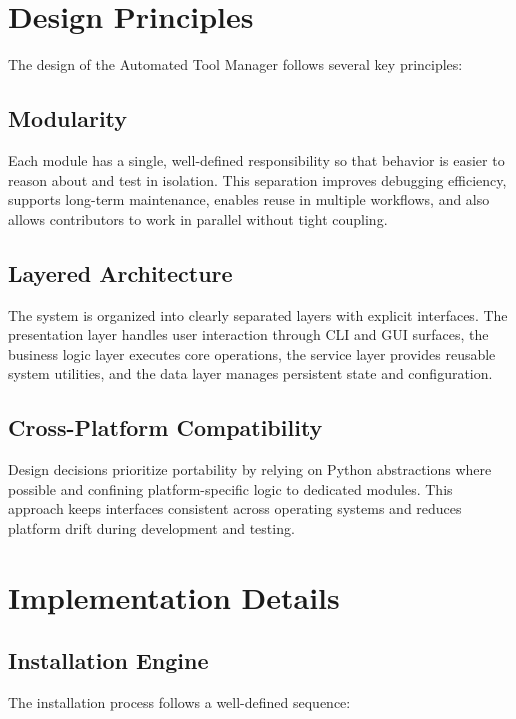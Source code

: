\documentclass[12pt,a4paper]{report}
\begin{document}
\section{Design Principles}
The design of the Automated Tool Manager follows several key principles:

\subsection{Modularity}
Each module has a single, well-defined responsibility so that behavior is easier to reason about and test in isolation. This separation improves debugging efficiency, supports long-term maintenance, enables reuse in multiple workflows, and also allows contributors to work in parallel without tight coupling.

\subsection{Layered Architecture}
The system is organized into clearly separated layers with explicit interfaces. The presentation layer handles user interaction through CLI and GUI surfaces, the business logic layer executes core operations, the service layer provides reusable system utilities, and the data layer manages persistent state and configuration.

\subsection{Cross-Platform Compatibility}
Design decisions prioritize portability by relying on Python abstractions where possible and confining platform-specific logic to dedicated modules. This approach keeps interfaces consistent across operating systems and reduces platform drift during development and testing.

\section{Implementation Details}

\subsection{Installation Engine}
The installation process follows a well-defined sequence:
\end{document}
